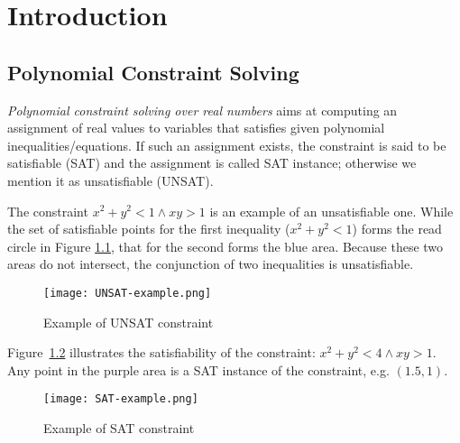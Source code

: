 \chapter{Introduction}
\section{Polynomial Constraint Solving}
{\em Polynomial constraint solving over real numbers} aims at computing an assignment of real values to variables
that satisfies given polynomial inequalities/equations. If such an assignment exists, the constraint is said to be satisfiable (SAT) and the assignment is called SAT instance; otherwise we mention it as unsatisfiable (UNSAT). 
\begin{example} \label{examp:unsat-example}
The constraint $x^2 + y^2 < 1 \wedge xy > 1$ is an example of an unsatisfiable one. While the set of satisfiable points for the first inequality ($x^2 + y^2 < 1$) forms the read circle in Figure \ref{fig:unsat-example}, that for the second forms the blue area. Because these two areas do not intersect, the conjunction of two inequalities is unsatisfiable.
\end{example}

\begin{figure}[ht]
\centering
\texttt{[image: UNSAT-example.png]} 
\caption{Example of UNSAT constraint} 
\label{fig:unsat-example} 
\end{figure} 

\begin{example} \label{examp:sat-example} \sloppy
Figure~\ref{fig:sat-example} illustrates the satisfiability of the constraint: ${x^2 + y^2 < 4 \wedge xy > 1}$. Any point in the purple area is a SAT instance of the constraint, e.g. $(1.5, 1)$.
\end{example}

\begin{figure}[ht]
\centering
\texttt{[image: SAT-example.png]} 
\caption{Example of SAT constraint} 
\label{fig:sat-example} 
\end{figure} 

